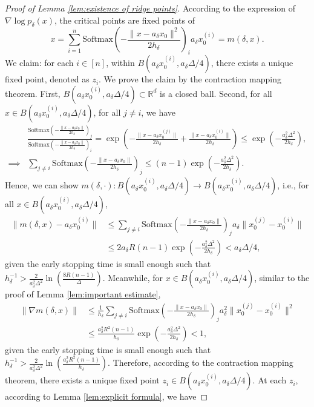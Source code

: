 \documentclass[11pt]{article}
\newcommand{\mb}{\mathbb}
\newcommand{\Softmax}{\mathrm{Softmax}}
\begin{document}
\begin{proof}[Proof of Lemma \ref{lem:existence of ridge points}]
According to the expression of $\nabla\log p_\delta(x)$, the critical points are fixed points of $$x=\sum_{i=1}^n \Softmax(-\frac{\|x-a_\delta x_0\|^2}{2h_\delta})_i a_\delta x_0^{(i)}=m(\delta,x).$$ We claim: for each $i\in[n]$, within $B(a_\delta x_0^{(i)}, a_\delta \Delta/4)$, there exists a unique fixed point, denoted as $z_i$. We prove the claim by the contraction mapping theorem. First, $B(a_\delta x_0^{(i)}, a_\delta \Delta/4)\subset \mb{R}^d$ is a closed ball. Second, for all $x\in B(a_\delta x_0^{(i)}, a_\delta \Delta/4)$, for all $j\neq i$, we have
\begin{align*}
    & \frac{\Softmax(-\frac{\|x-a_\delta x_0\|}{2h_\delta})_j}{\Softmax(-\frac{\|x-a_\delta x_0\|}{2h_\delta})_i} = \exp ( - \frac{\|x-a_\delta x_0^{(j)}\|}{2h_\delta}+\frac{\|x-a_\delta x_0^{(i)}\|}{2h_\delta})\le \exp(-\frac{a_\delta^2\Delta^2}{2h_\delta}), \\
    \implies &\sum_{j\neq i} \Softmax(-\frac{\|x-a_\delta x_0\|}{2h_\delta})_j \le (n-1)\exp(-\frac{a_\delta^2\Delta^2}{2h_\delta}).
\end{align*}
Hence, we can show $m(\delta,\cdot ):B(a_\delta x_0^{(i)}, a_\delta \Delta/4)\to B(a_\delta x_0^{(i)}, a_\delta \Delta/4)$, i.e., for all $x\in B(a_\delta x_0^{(i)}, a_\delta \Delta/4)$,
\begin{align*}
    \| m(\delta,x)- a_\delta x_0^{(i)} \| &\le \sum_{j\neq i} \Softmax(-\frac{\|x-a_\delta x_0\|}{2h_\delta})_j a_\delta \|x_0^{(j)}-x_0^{(i)}  \|\\
    &\le 2a_\delta R (n-1)\exp(-\frac{a_\delta^2\Delta^2}{2h_\delta}) < a_\delta \Delta/4,
\end{align*}
given the early stopping time is small enough such that $h_\delta^{-1}> \tfrac{2}{a_\delta^2 \Delta^2}\ln(\tfrac{8R(n-1)}{\Delta})$. Meanwhile, for $x\in B(a_\delta x_0^{(i)}, a_\delta \Delta/4)$, similar to the proof of Lemma \ref{lem:important estimate}, 
\begin{align*}
    \| \nabla m(\delta,x) \|&\le \frac{1}{h_\delta}\sum_{j\neq i} \Softmax(-\frac{\|x-a_\delta x_0\|}{2h_\delta})_j a_\delta^2 \| x_0^{(j)}-x_0^{(i)} \|^2 \\
    &\le \frac{a_\delta^2 R^2 (n-1)}{h_\delta} \exp(-\frac{a_\delta^2\Delta^2}{2h_\delta})<1,
\end{align*}
given the early stopping time is small enough such that $h_\delta^{-1}> \tfrac{2}{a_\delta^2 \Delta^2}\ln(\tfrac{a_\delta^2R^2(n-1)}{h_\delta})$. Therefore, according to the contraction mapping theorem, there exists a unique fixed point $z_i\in B(a_\delta x_0^{(i)}, a_\delta \Delta/4)$. At each $z_i$, according to Lemma \ref{lem:explicit formula}, we have

\end{proof}
\end{document}
